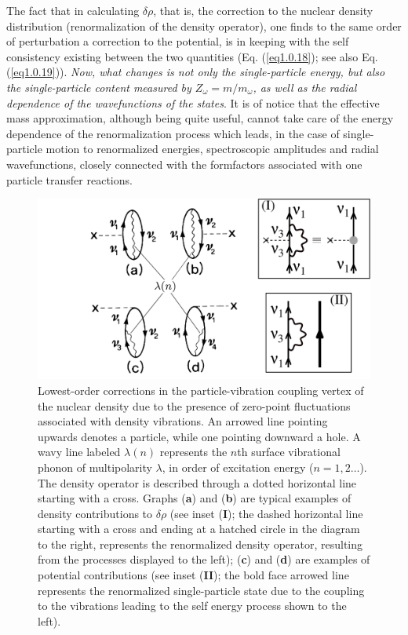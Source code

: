  The fact that in calculating $\delta\rho$, that is, the correction to the nuclear density distribution (renormalization of the density operator), one finds to the same order of perturbation a correction to the potential, is in keeping with the self consistency existing between the two quantities (Eq. (\ref{eq1.0.18}); see also Eq. (\ref{eq1.0.19})). \textit{Now, what changes is not only the single-particle energy, but also the single-particle content measured by $Z_\omega=m/m_\omega$, as well as the radial dependence of the wavefunctions of the states}. It is of notice that the effective mass approximation, although being quite useful, cannot take care of the energy dependence of the renormalization process which leads, in the case of single-particle motion to renormalized energies, spectroscopic amplitudes and radial wavefunctions, closely connected with the formfactors associated with one particle transfer reactions. 
\begin{figure}
	\centerline {
		\includegraphics*[width=15cm, angle=0.]{introduccion/figs/fig0_8_1}
	}
	\caption{Lowest-order corrections in the particle-vibration coupling vertex of the nuclear density due to the presence of zero-point fluctuations associated with density vibrations. An arrowed line pointing upwards denotes a particle, while one pointing downward a hole. A wavy line labeled $\lambda(n)$ represents the $n$th surface vibrational phonon of multipolarity $\lambda$, in order of excitation energy ($n=1,2\dots$). The density operator is described through a dotted horizontal line starting with a cross. Graphs (\textbf{a}) and (\textbf{b}) are typical examples of density contributions to $\delta\rho$ (see inset (\textbf{I}); the dashed horizontal line starting with a cross and ending at a hatched circle in the diagram to the right, represents the renormalized density operator, resulting from the processes displayed to the left); (\textbf{c}) and (\textbf{d}) are examples of potential contributions (see inset (\textbf{II}); the bold face arrowed line represents the renormalized single-particle state due to the coupling to the vibrations leading to the self energy process shown to the left).}
	\label{fig0.5.1}
\end{figure}
